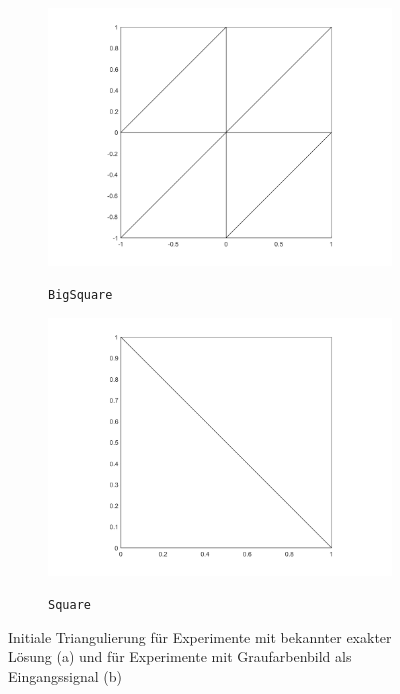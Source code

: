 \begin{figure}[p]
  \centering
  \begin{subfigure}[b]{.48\linewidth}
    \centering
    \caption{\texttt{BigSquare}}
    \includegraphics[trim = 90 30 90 20, clip, width=\linewidth]
      {pictures/chapExperiments/secGeneralInfo/bigSquareTriang.png}
    \label{fig:triangBigSquare}
  \end{subfigure}
  \quad
  \begin{subfigure}[b]{.48\linewidth}
    \centering
    \caption{\texttt{Square}}
    \includegraphics[trim = 90 30 90 20, clip, width=\linewidth]
      {pictures/chapExperiments/secGeneralInfo/squareTriang.png}
    \label{fig:triangSquare}
  \end{subfigure}
  \caption{Initiale Triangulierung für Experimente mit bekannter exakter Lösung
    (a) und für Experimente mit Graufarbenbild als Eingangssignal (b)}
  \label{fig:initialTriangulations}
\end{figure}
